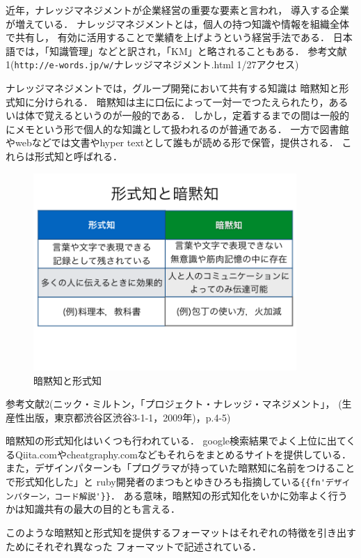 近年，ナレッジマネジメントが企業経営の重要な要素と言われ，
導入する企業が増えている．
ナレッジマネジメントとは，個人の持つ知識や情報を組織全体で共有し，
有効に活用することで業績を上げようという経営手法である．
日本語では，「知識管理」などと訳され，「KM」と略されることもある．
参考文献1(\verb|http://e-words.jp/w/|ナレッジマネジメント.html 1/27アクセス)

ナレッジマネジメントでは，グループ開発において共有する知識は
暗黙知と形式知に分けられる．
暗黙知は主に口伝によって一対一でつたえられたり，あるいは体で覚えるというのが一般的である．
しかし，定着するまでの間は一般的にメモという形で個人的な知識として扱われるのが普通である．
一方で図書館やwebなどでは文書やhyper textとして誰もが読める形で保管，提供される．
これらは形式知と呼ばれる．

\begin{figure}[htbp]\begin{center}
\includegraphics[width=10cm,bb= 0 0 737 453]{../figs/./my_help2hiki_saki.001.png}
\caption{暗黙知と形式知}
\label{default}\end{center}\end{figure}
参考文献2(ニック・ミルトン，「プロジェクト・ナレッジ・マネジメント」，
(生産性出版，東京都渋谷区渋谷3-1-1，2009年)，p.4-5)

暗黙知の形式知化はいくつも行われている．
google検索結果でよく上位に出てくるQiita.comやcheatgraphy.comなどもそれらをまとめるサイトを提供している．
また，デザインパターンも「プログラマが持っていた暗黙知に名前をつけることで形式知化した」と
ruby開発者のまつもとゆきひろも指摘している\verb|{{fn'デザインパターン，コード解説'}}|．
ある意味，暗黙知の形式知化をいかに効率よく行うかは知識共有の最大の目的とも言える．

このような暗黙知と形式知を提供するフォーマットはそれぞれの特徴を引き出すためにそれぞれ異なった
フォーマットで記述されている．

